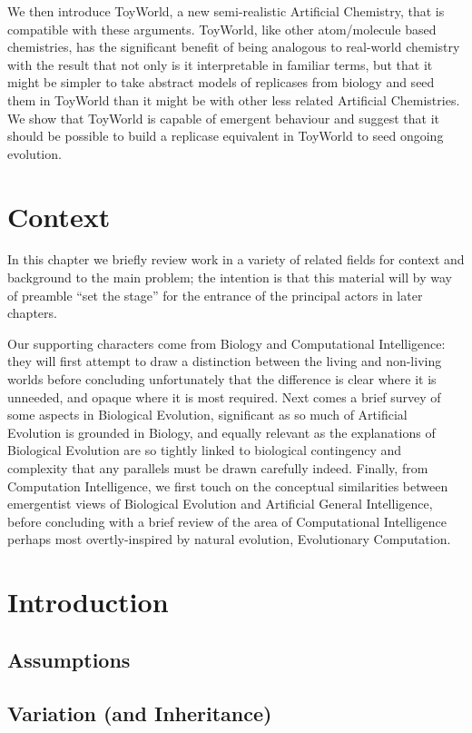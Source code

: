 \documentclass[]{report}
\begin{document}
We then introduce ToyWorld, a new semi-realistic Artificial Chemistry, that is compatible with these arguments. ToyWorld, like other atom/molecule based chemistries, has the significant benefit of being analogous to real-world chemistry with the result that not only is it interpretable in familiar terms, but that it might be simpler to take abstract models of replicases from biology and seed them in ToyWorld than it might be with other less related Artificial Chemistries. We show that ToyWorld is capable of emergent behaviour and suggest that it should be possible to build a replicase equivalent in ToyWorld to seed ongoing evolution.

\chapter{Context}
In this chapter we briefly review work in a variety of related fields for context and background to the main problem; the intention is that this material will by way of preamble ``set the stage'' for the entrance of the principal actors in later chapters.

Our supporting characters come from Biology and Computational Intelligence: they will first attempt to draw a distinction between the living and non-living worlds before concluding unfortunately that the difference is clear where it is unneeded, and opaque where it is most required. Next comes a brief survey of some aspects in Biological Evolution, significant as so much of Artificial Evolution is grounded in Biology, and equally relevant as the explanations of Biological Evolution are so tightly linked to biological contingency and complexity that any parallels must be drawn carefully indeed. Finally, from Computation Intelligence, we first touch on the conceptual similarities between emergentist views of Biological Evolution and Artificial General Intelligence, before concluding with a brief review of the area of Computational Intelligence perhaps most overtly-inspired by natural evolution, Evolutionary Computation.

\chapter{Introduction}\label{part-one}
\section{Assumptions}
\section{Variation (and Inheritance)}
\end{document}
